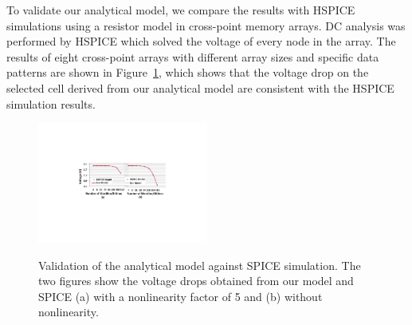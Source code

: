 To validate our analytical model, we compare the results with
HSPICE~\cite{HSPICE} simulations using a resistor model in cross-point
memory arrays. DC analysis was performed by HSPICE which solved the
voltage of every node in the array. The results of eight cross-point
arrays with different array sizes and specific data patterns are shown in
Figure~\ref{fig:validation}, which shows that the voltage drop on the
selected cell derived from our analytical model are consistent with the
HSPICE simulation results.
\begin{figure}%
\centering\label{fig:SPICE}
  \includegraphics[width=0.5\textwidth]{./figures/SPICE1.pdf}\\
  \caption{Validation of the analytical model against SPICE simulation. The two figures show the voltage drops obtained from our model and SPICE (a) with a nonlinearity factor of 5 and (b) without nonlinearity.}\label{fig:validation}
    \vspace{-10pt}
\end{figure}
%
